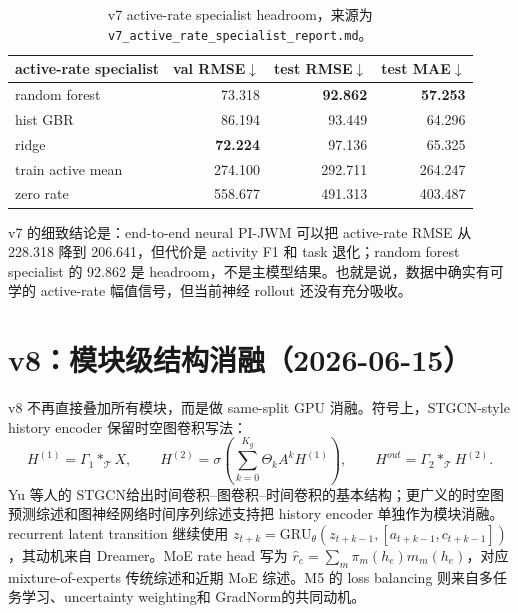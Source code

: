 \documentclass[UTF8,a4paper,11pt]{ctexart}
\newcommand{\code}[1]{\texttt{#1}}
\begin{document}
\begin{table}[H]
\centering
\small
\begin{tabular}{lrrr}
\toprule
active-rate specialist & val RMSE$\downarrow$ & test RMSE$\downarrow$ & test MAE$\downarrow$ \\
\midrule
random forest & 73.318 & \textbf{92.862} & \textbf{57.253} \\
hist GBR & 86.194 & 93.449 & 64.296 \\
ridge & \textbf{72.224} & 97.136 & 65.325 \\
train active mean & 274.100 & 292.711 & 264.247 \\
zero rate & 558.677 & 491.313 & 403.487 \\
\bottomrule
\end{tabular}
\caption{v7 active-rate specialist headroom，来源为 \code{v7\_active\_rate\_specialist\_report.md}。}
\end{table}

v7 的细致结论是：end-to-end neural PI-JWM 可以把 active-rate RMSE 从 228.318 降到 206.641，但代价是 activity F1 和 task 退化；random forest specialist 的 92.862 是 headroom，不是主模型结果。也就是说，数据中确实有可学的 active-rate 幅值信号，但当前神经 rollout 还没有充分吸收。

\section{v8：模块级结构消融（2026-06-15）}

v8 不再直接叠加所有模块，而是做 same-split GPU 消融。符号上，STGCN-style history encoder 保留时空图卷积写法：
\[
H^{(1)}=\Gamma_1 *_\mathcal{T} X,
\qquad
H^{(2)}=\sigma\left(\sum_{k=0}^{K_g}\Theta_k A^kH^{(1)}\right),
\qquad
H^{out}=\Gamma_2 *_\mathcal{T} H^{(2)}.
\]
Yu 等人的 STGCN给出时间卷积--图卷积--时间卷积的基本结构；更广义的时空图预测综述和图神经网络时间序列综述支持把 history encoder 单独作为模块消融。recurrent latent transition 继续使用 $z_{t+k}=\mathrm{GRU}_\theta(z_{t+k-1},[a_{t+k-1},c_{t+k-1}])$，其动机来自 Dreamer。MoE rate head 写为 $\hat r_e=\sum_m\pi_m(h_e)m_m(h_e)$，对应 mixture-of-experts 传统综述和近期 MoE 综述。M5 的 loss balancing 则来自多任务学习、uncertainty weighting和 GradNorm的共同动机。
\end{document}
